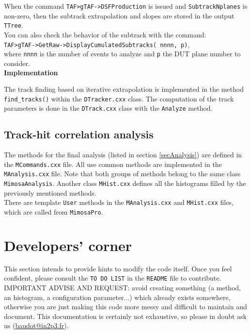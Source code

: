\documentclass[a4paper, 12pt, twoside]{article}
\begin{document}
\noindent
When the command {\tt TAF>gTAF->DSFProduction} is issued and {\tt SubtrackNplanes} is non-zero, then the subtrack extrapolation and slopes are stored in the output {\tt TTree}.\\
You can also check the behavior of the subtrack with the command:\\
{\tt TAF>gTAF->GetRaw->DisplayCumulatedSubtracks( nnnn, p)},\\
where {\tt nnnn} is the number of events to analyze and {\tt p} the DUT plane number to consider.\\


\noindent
{\bf Implementation}

\noindent
The track finding based on iterative extrapolation is implemented in the method {\tt find\_tracks()} within the {\tt DTracker.cxx} class. The computation of the track parameters is done in the {\tt DTrack.cxx} class with the {\tt Analyze} method.



\subsection{Track-hit correlation analysis}

\noindent
The methods for the final analysis (listed in section \ref{secAnalysis}) are defined in the {\tt MCommands.cxx} file. All use common methods are implemented in the {\tt MAnalysis.cxx} file. Note that both groups of methods belong to the same class {\tt MimosaAnalysis}. Another class {\tt MHist.cxx} defines all the histograms filled by the previously mentioned methods.\\
There are template {\tt User} methods in the  {\tt MAnalysis.cxx} and {\tt MHist.cxx} files, which are called from {\tt MimosaPro}.\\



\vspace{2cm}

\section{Developers' corner}
\label{secDeveloper}

This section intends to provide hints to modify the code itself. Once you feel confident, please consult the {\tt TO DO LIST} in the {\tt README} file to contribute.\\

\noindent
IMPORTANT ADVISE AND REQUEST: avoid creating something (a method, an histogram, a configuration parameter...) which already exists somewhere, otherwise you are just making this code more messy and difficult to maintain and document. This documentation is certainly not exhaustive, so please in doubt ask us (\href{mailto:baudot@in2p3.fr}{baudot@in2p3.fr}).\\
\end{document}
